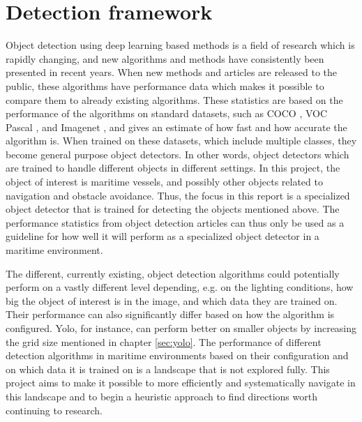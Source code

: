 \section{Detection framework}
Object detection using deep learning based methods is a field of research which is rapidly changing, and new algorithms and methods have consistently been presented in recent years. When new methods and articles are released to the public, these algorithms have performance data which makes it possible to compare them to already existing algorithms. These statistics are based on the performance of the algorithms on standard datasets, such as COCO \citep{COCO}, VOC Pascal \citep{Everingham2007} \citep{Everingham2012}, and Imagenet \citep{Imagenet}, and gives an estimate of how fast and how accurate the algorithm is. When trained on these datasets, which include multiple classes, they become general purpose object detectors. In other words, object detectors which are trained to handle different objects in different settings. In this project, the object of interest is maritime vessels, and possibly other objects related to navigation and obstacle avoidance. Thus, the focus in this report is a specialized object detector that is trained for detecting the objects mentioned above. The performance statistics from object detection articles can thus only be used as a guideline for how well it will perform as a specialized object detector in a maritime environment. 

\vspace{3mm}

The different, currently existing, object detection algorithms could potentially perform on a vastly different level depending, e.g. on the lighting conditions, how big the object of interest is in the image, and which data they are trained on. Their performance can also significantly differ based on how the algorithm is configured. Yolo, for instance, can perform better on smaller objects by increasing the grid size mentioned in chapter \ref{sec:yolo}. The performance of different detection algorithms in maritime environments based on their configuration and on which data it is trained on is a landscape that is not explored fully. This project aims to make it possible to more efficiently and systematically navigate in this landscape and to begin a heuristic approach to find directions worth continuing to research.

